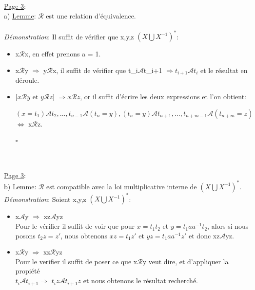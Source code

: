 \documentclass{article}
\begin{document}
\underline{Page 3}:\\

\parindent 0mm a) \underline{Lemme}:
 $\mathcal{R}$ est une relation d'équivalence.\\

 \\
 \textit{Démonstration}: Il suffit de vérifier que \forall x,y,z \in $(X\bigcup X^{-1})^{*}$:
 \begin{itemize}
     \item x$\mathcal{R}$x, en effet prenons a = 1.
     
     \item x$\mathcal{R}$y $\Rightarrow$ y$\mathcal{R}$x, il suffit de vérifier que t_{i}$\mathcal{A}$t_{i+1}  $\Rightarrow t_{i+1}\mathcal{A}t_{i}$ et le résultat en déroule.
     
     \item $\bigr[x\mathcal{R}y$ et $y\mathcal{R}z\bigr]$ $\Rightarrow x\mathcal{R}z$, or il suffit d'écrire les deux expressions et l'on obtient:
     
    $(x=t_1)\mathcal{A}t_2,\dots, t_{n-1}\mathcal{A}(t_n=y),(t_n=y)\mathcal{A}t_{n+1},\dots, t_{n+m-1}\mathcal{A}(t_{n+m}=z)$ $\Leftrightarrow$ x$\mathcal{R}$z. \\
    \begin{flushright}
        $\square$
    \end{flushright}
        
 \end{itemize} \\~\\

\underline{Page 3}:\\

\parindent 0mm b) \underline{Lemme}:
$\mathcal{R}$ est compatible avec la loi multiplicative interne de $(X\bigcup X^{-1})^{*}$.\\

\textit{Démonstration}: Soient x,y,z \in $(X\bigcup X^{-1})^{*}$:
\begin{itemize}
    \item x$\mathcal{A}$y $\Rightarrow$ xz$\mathcal{A}$yz \\
    Pour le vérifier il suffit de voir que pour $x=t_1t_2$ et $y=t_1aa^{-1}t_2$, alors si nous posons $t_2z=z'$, nous obtenons $xz=t_1z'$ et $yz=t_1aa^{-1}z'$ et donc xz$\mathcal{A}$yz.
    \item x$\mathcal{R}$y $\Rightarrow$ xz$\mathcal{R}$yz\\
    Pour le verifier il suffit de poser ce que x$\mathcal{R}$y veut dire, et d'appliquer la propiété\\
    $t_i\mathcal{A}t_{i+1}$$\Rightarrow$ $t_iz\mathcal{A}t_{i+1}z$ et nous obtenons le résultat recherché. \\
\end{itemize}
\\
\end{document}
